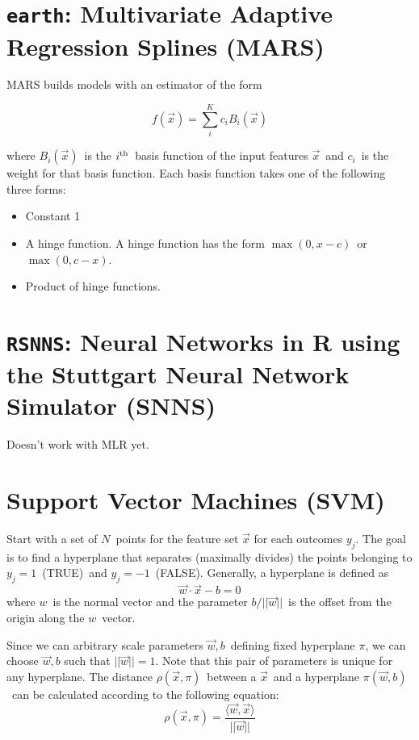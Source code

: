 \documentclass[11pt, oneside]{article}   	%
\newcommand{\vx}{\vec{x}}
\newcommand{\yj}{y_{j}}
\begin{document}
\section{{\tt earth}: Multivariate Adaptive Regression Splines (MARS)}

MARS builds models with an estimator of the form

\begin{equation}
f(\vx) = \sum_{i}^{K} c_{i} B_{i}(\vx)
\end{equation}

where $B_{i}(\vx)$~is the $i^{\rm{th}}$~basis function of the input features $\vx$~and $c_{i}$~is the weight for that basis function. Each basis function takes one of the following three forms:
\begin{itemize}
\item Constant 1
\item A hinge function. A hinge function has the form $\max(0, x - c)$~or $\max(0, c - x)$.
\item Product of hinge functions.
\end{itemize}


\section{{\tt RSNNS}: Neural Networks in R using the Stuttgart Neural Network Simulator (SNNS)}

Doesn't work with MLR yet.

\section{Support Vector Machines (SVM)}

Start with a set of $N$~points for the feature set $\vx$ for each outcomes $\yj$. The goal is to find a hyperplane that separates (maximally divides) the points belonging to $\yj=1$~(TRUE)~and $\yj=-1$~(FALSE). Generally, a hyperplane is defined as
\begin{equation}
\vec{w} \cdot \vx - b = 0
\end{equation}
where $w$~is the normal vector and the parameter $b/||\vec{w}||$~is the offset from the origin along the $w$~vector.

Since we can arbitrary scale parameters $\vec{w},b$~defining fixed hyperplane $\pi$, we can choose $\vec{w},b$ such that $||\vec{w}|| = 1$. Note that this pair of parameters is unique for any hyperplane. The distance $\rho(\vx,\pi)$~between a $\vx$~and a hyperplane $\pi(\vec{w},b)$~can be calculated according to the following equation:
\begin{equation}
\rho(\vx,\pi)= \frac{\langle \vec{w},\vx \rangle}{||\vec{w}||}
\end{equation}
\end{document}
